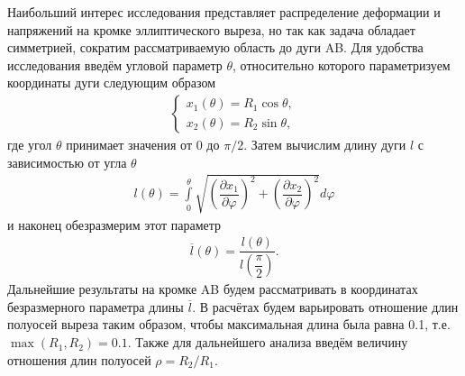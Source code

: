 Наибольший интерес исследования представляет распределение деформации и напряжений на кромке эллиптического выреза, но так как задача обладает симметрией, сократим рассматриваемую область до дуги AB. Для удобства исследования введём угловой параметр $\theta$, относительно которого параметризуем координаты дуги следующим образом
\begin{gather*}
	\begin{cases}
		x_1 (\theta) = R_1 \cos \theta, \\
		x_2 (\theta) = R_2 \sin \theta,
	\end{cases}
\end{gather*}
где угол $\theta$ принимает значения от 0 до $\pi / 2$. Затем вычислим длину дуги $l$ с зависимостью от угла $\theta$
\begin{gather*}
	l (\theta) = \int\limits_0^{\theta} \sqrt{
		\left( \dfrac{\partial x_1}{\partial \varphi} \right)^2 +
		\left( \dfrac{\partial x_2}{\partial \varphi} \right)^2
	} d \varphi
\end{gather*}
и наконец обезразмерим этот параметр
\begin{gather}
	\label{eq:NaturalParameter}
	\overline{l} (\theta) = \dfrac{l (\theta)}{l \left( \dfrac{\pi}{2} \right)}.
\end{gather}
Дальнейшие результаты на кромке AB будем рассматривать в координатах безразмерного параметра длины $\overline{l}$. В расчётах будем варьировать отношение длин полуосей выреза таким образом, чтобы максимальная длина была равна 0.1, т.е. $\max(R_1, R_2) = 0.1$. Также для дальнейшего анализа введём величину отношения длин полуосей $\rho = R_2 / R_1$.

